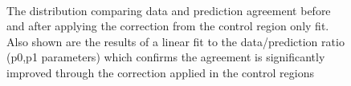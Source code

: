 \begin{figure}[tbhp]
\begin{center}
        \\
        \caption{The \njet distribution comparing data and prediction agreement before and after applying the correction from the control region only fit. Also shown are the results of a linear fit to the data/prediction ratio (p0,p1 parameters) which confirms the agreement is significantly improved through the correction applied in the control regions}
    \end{center}
\end{figure}
